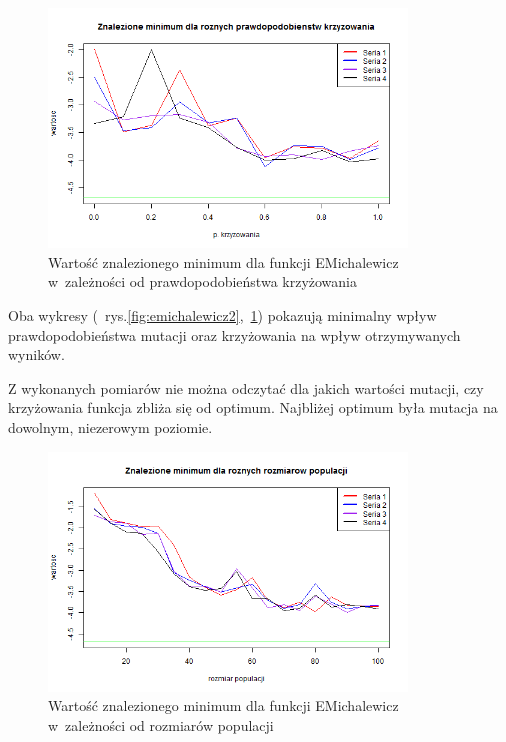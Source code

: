 \documentclass[11pt, a4paper]{article}
\newcommand{\fbi}{\leavevmode{\parindent=1em\indent}}
\begin{document}
\begin{figure}[H]
	\begin{center}
		\includegraphics[width=0.85\textwidth]{./assets/EMichalewicz3.png}
		\caption{Wartość znalezionego minimum dla funkcji EMichalewicz w~zależności od prawdopodobieństwa krzyżowania}
		\label{fig:emichalewicz3}
	\end{center}
\end{figure}

\fbi
Oba wykresy (~rys.\ref{fig:emichalewicz2},~\ref{fig:emichalewicz3}) pokazują minimalny wpływ prawdopodobieństwa mutacji oraz krzyżowania na wpływ otrzymywanych wyników. 

\fbi
Z wykonanych pomiarów nie można odczytać dla jakich wartości mutacji, czy krzyżowania funkcja zbliża się od optimum. Najbliżej optimum była mutacja na dowolnym, niezerowym poziomie.

\begin{figure}[H]
	\begin{center}
		\includegraphics[width=0.85\textwidth]{./assets/EMichalewicz4.png}
		\caption{Wartość znalezionego minimum dla funkcji EMichalewicz w~zależności od rozmiarów populacji}
		\label{fig:emichalewicz4}
	\end{center}
\end{figure}
\end{document}
